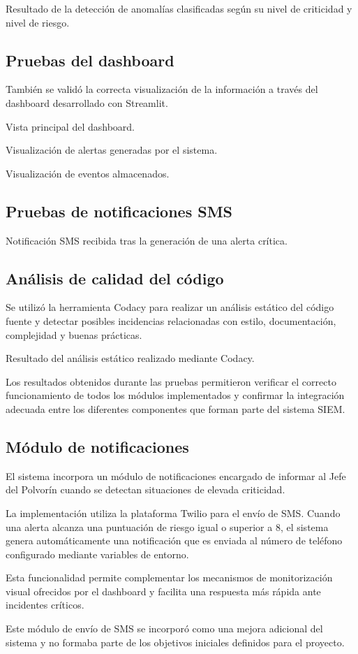 {Resultado de la detección de anomalías clasificadas según su nivel de criticidad y nivel de riesgo.}

\subsection{Pruebas del dashboard}

También se validó la correcta visualización de la información a través del dashboard desarrollado con Streamlit.

{Vista principal del dashboard.}

{Visualización de alertas generadas por el sistema.}

{Visualización de eventos almacenados.}

\subsection{Pruebas de notificaciones SMS}

{Notificación SMS recibida tras la generación de una alerta crítica.}

\subsection{Análisis de calidad del código}

Se utilizó la herramienta Codacy para realizar un análisis estático del código fuente y detectar posibles incidencias relacionadas con estilo, documentación, complejidad y buenas prácticas.

{Resultado del análisis estático realizado mediante Codacy.}

Los resultados obtenidos durante las pruebas permitieron verificar el correcto funcionamiento de todos los módulos implementados y confirmar la integración adecuada entre los diferentes componentes que forman parte del sistema SIEM.


\subsection{Módulo de notificaciones}

El sistema incorpora un módulo de notificaciones encargado de informar al Jefe del Polvorín cuando se detectan situaciones de elevada criticidad.

La implementación utiliza la plataforma Twilio para el envío de SMS. Cuando una alerta alcanza una puntuación de riesgo igual o superior a 8, el sistema genera automáticamente una notificación que es enviada al número de teléfono configurado mediante variables de entorno.

Esta funcionalidad permite complementar los mecanismos de monitorización visual ofrecidos por el dashboard y facilita una respuesta más rápida ante incidentes críticos.

Este módulo de envío de SMS se incorporó como una mejora adicional del sistema y no formaba parte de los objetivos iniciales definidos para el proyecto.


